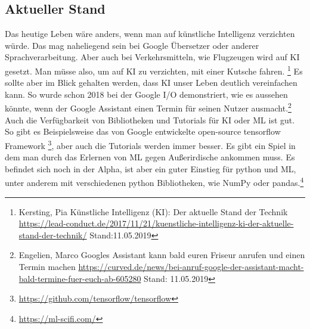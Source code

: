 \documentclass[12pt,a4paper]{article}
\begin{document}
	\subsection{Aktueller Stand}
	Das heutige Leben wäre anders, wenn man auf künstliche Intelligenz verzichten würde. Das mag naheliegend sein bei Google Übersetzer oder anderer Sprachverarbeitung. Aber auch bei Verkehrsmitteln, wie Flugzeugen wird auf KI gesetzt. Man müsse also, um auf KI zu verzichten, mit einer Kutsche fahren. \footnote{Kersting, Pia \glqq Künstliche Intelligenz (KI): Der aktuelle Stand der Technik \grqq{} \url{https://lead-conduct.de/2017/11/21/kuenstliche-intelligenz-ki-der-aktuelle-stand-der-technik/} Stand:11.05.2019}
	Es sollte aber im Blick gehalten werden, dass KI unser Leben deutlich vereinfachen kann. So wurde schon 2018 bei der Google I/O demonstriert, wie es aussehen könnte, wenn der Google Assistant einen Termin für seinen Nutzer ausmacht.\footnote{Engelien, Marco \glqq Googles Assistant kann bald euren Friseur anrufen und einen Termin machen \grqq{} \url{https://curved.de/news/bei-anruf-google-der-assistant-macht-bald-termine-fuer-euch-ab-605280} Stand: 11.05.2019}
	Auch die Verfügbarkeit von Bibliotheken und Tutorials für KI oder ML ist gut. So gibt es Beispielsweise das von Google entwickelte open-source tensorflow Framework \footnote{\url{https://github.com/tensorflow/tensorflow}}, aber auch die Tutorials werden immer besser. Es gibt ein Spiel in dem man durch das Erlernen von ML gegen Außerirdische ankommen muss. Es befindet sich noch in der Alpha, ist aber ein guter Einstieg für python und ML, unter anderem mit verschiedenen python Bibliotheken, wie NumPy oder pandas.\footnote{\url{https://ml-scifi.com/}}
\end{document}
